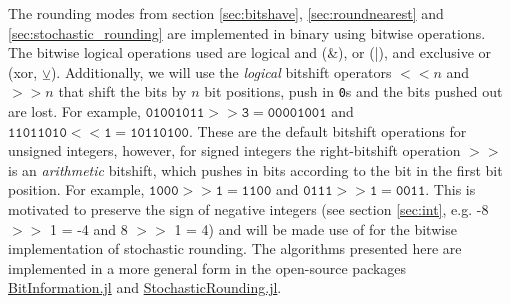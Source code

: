 The rounding modes from section \ref{sec:bitshave}, \ref{sec:roundnearest} and \ref{sec:stochastic_rounding} are 
implemented in binary using bitwise operations. The bitwise logical operations used are logical and (\&), or (|), and
exclusive or (xor, $\veebar$). Additionally, we will use the \emph{logical} bitshift operators $<< n$ and $>> n$ that shift the
bits by $n$ bit positions, push in \texttt{0}s and the bits pushed out are lost. For example, $\mathtt{01001011 >> 3 = 00001001}$
and $\mathtt{11011010 << 1 = 10110100}$. These are the default bitshift operations for unsigned integers, however,
for signed integers the right-bitshift operation $>>$ is an \emph{arithmetic} bitshift, which pushes in bits according to the
bit in the first bit position. For example, $\mathtt{1000 >> 1 = 1100}$ and $\mathtt{0111 >> 1 = 0011}$. This is motivated to
preserve the sign of negative integers (see section \ref{sec:int}, e.g. -8 $>>$ 1 = -4 and 8 $>>$ 1 = 4) and will be made use
of for the bitwise implementation of stochastic rounding. The algorithms presented here are implemented in a more general
form in the open-source packages \href{https://github.com/milankl/BitInformation.jl}{BitInformation.jl}
and \href{https://github.com/milankl/StochasticRounding.jl}{StochasticRounding.jl}.

